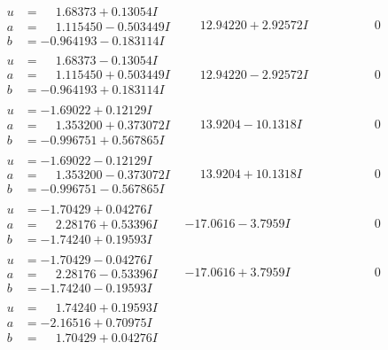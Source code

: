 \documentclass[1p]{elsarticle_modified}
\theoremstyle{definition}
\begin{document}
$$\begin{array}{c|c|c}
 \hline 
\begin{aligned}
u &= \phantom{-}1.68373 + 0.13054 I \\
a &= \phantom{-}1.115450 - 0.503449 I \\
b &= -0.964193 - 0.183114 I\end{aligned}
 & \phantom{-}12.94220 + 2.92572 I & \phantom{-0.000000 } 0 \\ \hline\begin{aligned}
u &= \phantom{-}1.68373 - 0.13054 I \\
a &= \phantom{-}1.115450 + 0.503449 I \\
b &= -0.964193 + 0.183114 I\end{aligned}
 & \phantom{-}12.94220 - 2.92572 I & \phantom{-0.000000 } 0 \\ \hline\begin{aligned}
u &= -1.69022 + 0.12129 I \\
a &= \phantom{-}1.353200 + 0.373072 I \\
b &= -0.996751 + 0.567865 I\end{aligned}
 & \phantom{-}13.9204 - 10.1318 I & \phantom{-0.000000 } 0 \\ \hline\begin{aligned}
u &= -1.69022 - 0.12129 I \\
a &= \phantom{-}1.353200 - 0.373072 I \\
b &= -0.996751 - 0.567865 I\end{aligned}
 & \phantom{-}13.9204 + 10.1318 I & \phantom{-0.000000 } 0 \\ \hline\begin{aligned}
u &= -1.70429 + 0.04276 I \\
a &= \phantom{-}2.28176 + 0.53396 I \\
b &= -1.74240 + 0.19593 I\end{aligned}
 & -17.0616 - 3.7959 I & \phantom{-0.000000 } 0 \\ \hline\begin{aligned}
u &= -1.70429 - 0.04276 I \\
a &= \phantom{-}2.28176 - 0.53396 I \\
b &= -1.74240 - 0.19593 I\end{aligned}
 & -17.0616 + 3.7959 I & \phantom{-0.000000 } 0 \\ \hline\begin{aligned}
u &= \phantom{-}1.74240 + 0.19593 I \\
a &= -2.16516 + 0.70975 I \\
b &= \phantom{-}1.70429 + 0.04276 I\end{aligned}

\end{array}$$
\end{document}

